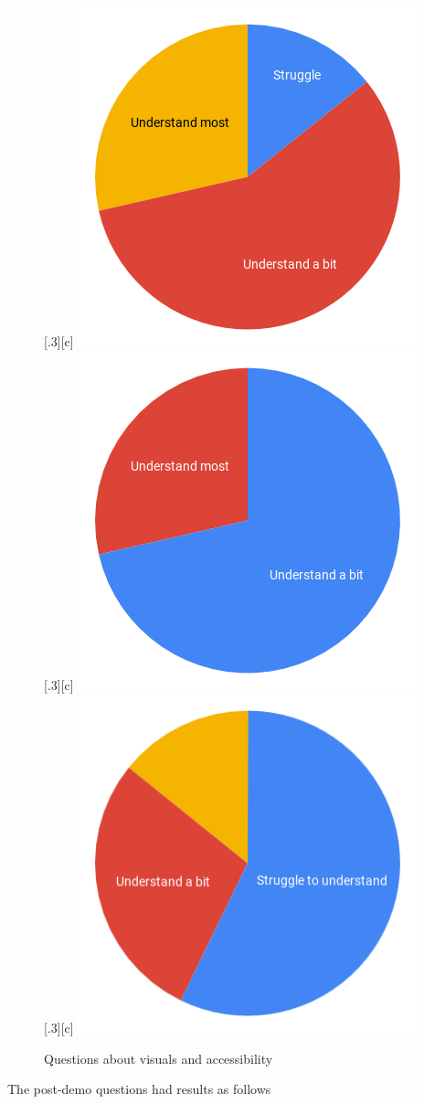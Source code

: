 \documentclass[ %
                    author={Aleena Baig},
                supervisor={Dr Simon Lock},
                    degree={BSc},
                     title={On Making Web Accessible Graphs},
                  subtitle={},
                      year={2019} ]{dissertation}
\begin{document}
\begin{figure}[H]
  \centering
  [.3\linewidth][c]{%
    \includegraphics[width=.3\linewidth]{images/ImagesAccessible.png}}\quad
  [.3\linewidth][c]{%
    \includegraphics[width=.3\linewidth]{images/TablesAccessible.png}}\quad
  [.3\linewidth][c]{%
    \includegraphics[width=.3\linewidth]{images/DataVizAccessible.png}}\quad
\caption{Questions about visuals and accessibility}
\end{figure}

The post-demo questions had results as follows
\end{document}
